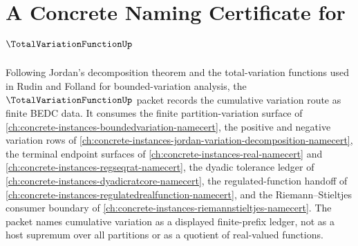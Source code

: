 \chapter{A Concrete Naming Certificate for $\TotalVariationFunctionUp$}
\label{ch:concrete-instances-total-variation-function-namecert}

Following Jordan's decomposition theorem and the total-variation functions used in Rudin and Folland for bounded-variation analysis, the $\TotalVariationFunctionUp$ packet records the cumulative variation route as finite BEDC data. It consumes the finite partition-variation surface of \autoref{ch:concrete-instances-boundedvariation-namecert}, the positive and negative variation rows of \autoref{ch:concrete-instances-jordan-variation-decomposition-namecert}, the terminal endpoint surfaces of \autoref{ch:concrete-instances-real-namecert} and \autoref{ch:concrete-instances-regseqrat-namecert}, the dyadic tolerance ledger of \autoref{ch:concrete-instances-dyadicratcore-namecert}, the regulated-function handoff of \autoref{ch:concrete-instances-regulatedrealfunction-namecert}, and the Riemann--Stieltjes consumer boundary of \autoref{ch:concrete-instances-riemannstieltjes-namecert}. The packet names cumulative variation as a displayed finite-prefix ledger, not as a host supremum over all partitions or as a quotient of real-valued functions.

